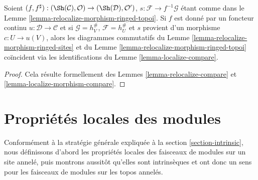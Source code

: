 \begin{lemma}
\label{lemma-relocalize-morphism-compare}
Soient
$(f, f^\sharp) :
(\Sh(\mathcal{C}), \mathcal{O})
\to
(\Sh(\mathcal{D}), \mathcal{O}')$,
$s : \mathcal{F} \to f^{-1}\mathcal{G}$ étant comme dans le
Lemme \ref{lemma-relocalize-morphism-ringed-topoi}.
Si $f$ est donné par un foncteur continu
$u : \mathcal{D} \to \mathcal{C}$
et si $\mathcal{G} = h_V^\#$, $\mathcal{F} = h_U^\#$ et $s$ provient d'un
morphisme $c : U \to u(V)$, alors les diagrammes commutatifs du
Lemme \ref{lemma-relocalize-morphism-ringed-sites}
et du
Lemme \ref{lemma-relocalize-morphism-ringed-topoi}
coïncident via les identifications du
Lemme \ref{lemma-localize-compare}.
\end{lemma}

\begin{proof}
Cela résulte formellement des
Lemmes \ref{lemma-relocalize-compare} et
\ref{lemma-localize-morphism-compare}.
\end{proof}

















\section{Propriétés locales des modules}
\label{section-local}

\noindent
Conformément à la stratégie générale expliquée à la
section \ref{section-intrinsic}, nous définissons d'abord les propriétés
locales des faisceaux de modules sur un site annelé, puis montrons aussitôt
qu'elles sont intrinsèques et ont donc un sens pour les faisceaux de modules
sur les topos annelés.

